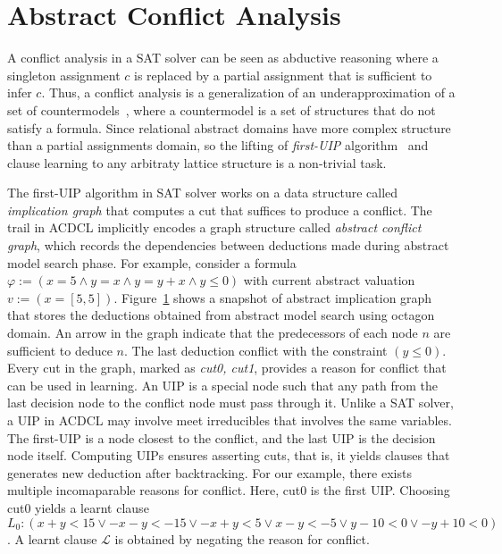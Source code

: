 \section{Abstract Conflict Analysis}
A conflict analysis in a SAT solver can be seen as abductive 
reasoning where a singleton assignment $c$ is replaced by a partial 
assignment that is sufficient to infer $c$.  Thus, a conflict 
analysis is a generalization of an underapproximation of a set of 
countermodels~\cite{sas,dhk2013-popl}, where a countermodel is a 
set of structures that do not satisfy a formula.  Since relational 
abstract domains have more complex structure than a partial 
assignments domain, so the lifting of {\em first-UIP} algorithm~\cite{uip} 
and clause learning to any arbitraty lattice structure is a non-trivial task. 

The first-UIP algorithm in SAT solver works on a data structure called 
{\em implication graph} that computes a cut that suffices to produce a 
conflict.  The trail in ACDCL implicitly encodes a graph structure called 
{\em abstract conflict graph}, which records the dependencies between 
deductions made during abstract model search phase.  For example, consider a
formula $\varphi:= (x=5 \wedge y=x \wedge y=y+x \wedge y \leq 0)$ with current 
abstract valuation $v:= (x=[5,5])$.  
Figure~\ref{conflict} shows a snapshot of abstract implication graph that 
stores the deductions obtained from abstract model search using octagon domain.  
An arrow in the graph indicate that the predecessors of each node $n$ are 
sufficient to deduce $n$.  The last deduction conflict with the constraint 
$(y \leq 0)$.  Every cut in the graph, marked as {\em cut0, cut1}, provides a 
reason for conflict that can be used in learning.  An UIP is a special node such 
that any path from the last decision node to the conflict node must pass 
through it.  Unlike a SAT solver, a UIP in ACDCL may involve meet irreducibles 
that involves the same variables.  The first-UIP is a node closest to the 
conflict, and the last UIP is the decision node itself.  Computing UIPs ensures 
asserting cuts, that is, it yields clauses that generates new deduction after 
backtracking.  For our example, there exists multiple incomaparable reasons 
for conflict.  Here, cut0 is the first UIP.  Choosing cut0 yields a learnt 
clause $L_0: (x+y<15 \vee -x-y<-15 \vee -x+y<5 \vee x-y<-5 \vee y-10<0 \vee 
-y+10<0)$.  A learnt clause $\mathcal{L}$ is obtained by negating the reason 
for conflict.  
%
\begin{figure}
\label{conflict}
\end{figure} 
%    

